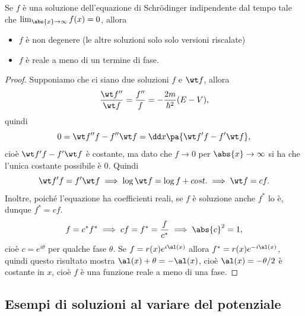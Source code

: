 \begin{remark}
Se $f$ \`e una soluzione dell'equazione di Schr\"odinger indipendente dal tempo tale che $\lim_{\abs{x}\to\infty} f(x)=0$, allora
\begin{itemize}
\item $f$ \`e non degenere (le altre soluzioni solo solo versioni riscalate)
\item $f$ \`e reale a meno di un termine di fase.
\end{itemize}
\end{remark}
\begin{proof}
Supponiamo che ci siano due soluzioni $f$ e $\wt f$, allora
\[\frac{\wt f''}{\wt f}=\frac{f''}f=-\frac{2m}{\hbar^2}(E-V),\]
quindi
\[0=\wt f'' f-f''\wt f=\dd x{}\pa{\wt f' f-f'\wt f},\]
cio\`e $\wt f' f-f'\wt f$ \`e costante, ma dato che $f\to 0$ per $\abs{x}\to\infty$ si ha che l'unica costante possibile \`e $0$. Quindi
\[\wt f'f=f'\wt f\implies \log \wt f=\log f + cost.\implies \wt f=cf.\]
Inoltre, poich\'e l'equazione ha coefficienti reali, se $f$ \`e soluzione anche $f^\ast$ lo \`e, dunque $f^\ast=cf$.
\[f=c^\ast f^\ast\implies cf=f^\ast=\frac f{c^\ast}\implies \abs{c}^2=1,\]
cio\`e $c=e^{i\theta}$ per qualche fase $\theta$. Se $f=r(x)e^{i\al(x)}$ allora $f^\ast=r(x)e^{-i\al(x)}$, quindi questo risultato mostra $\al(x)+\theta=-\al(x)$, cio\`e $\al(x)=-\theta/2$ \`e costante in $x$, cio\`e $f$ \`e una funzione reale a meno di una fase.
\end{proof}


\subsection{Esempi di soluzioni al variare del potenziale}
